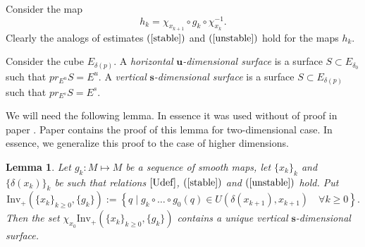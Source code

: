 \documentclass[11pt]{article}
\newcounter{razdel}[section]
\theoremstyle{Mystyle}
\newtheorem{Lemma}[razdel]{Lemma}
\begin{document}
Consider the map 
\begin{equation}
\label{hkdef}
h_{k} = \chi_{x_{k+1}}\circ g_k\circ \chi_{x_k}^{-1}.
\end{equation}
 Clearly the analogs of estimates $(\ref{stable})$ and $(\ref{unstable})$ hold for the maps $h_{k}$.


Consider the cube $E_{\delta(p)}$.
A \textit{horizontal} $\textbf{u}$\textit{-dimensional surface} is a surface $S\subset E_{\delta_0}$ such that $pr_{E^u}S = E^u$. A \textit{vertical }$\textbf{s}$\textit{-dimensional surface} is a surface $S\subset E_{\delta(p)}$ such that $pr_{E^s}S = E^{s}$.

We will need the following lemma. In essence it was used without of proof in paper \cite{Con}. Paper \cite{PS} contains the proof of this lemma for two-dimensional case. In essence, we generalize this proof to the case of higher dimensions. 

\begin{Lemma}
\label{LK}
Let $g_k: M\mapsto M$ be a sequence of smooth maps,  
let $\{x_k\}_{k}$ and $\{\delta(x_k)\}_{k}$ be
such that relations $\eqref{Udef}$,
$(\ref{stable})$ and 
$(\ref{unstable})$ hold. 
Put $$\mbox{Inv}_+(\{x_k\}_{k\geq0},\{g_k\}):= \left\{ q\mid g_{k}\circ\ldots\circ g_0(q)\in U(\delta(x_{k+1}), x_{k+1}) \quad\forall k\geq 0\right\}.$$
Then the set $\chi_{x_0}\mbox{Inv}_+(\{x_k\}_{k\geq0},\{g_k\})$ contains a unique vertical $\textbf{s}$-dimensional surface.
\end{Lemma}
\end{document}
